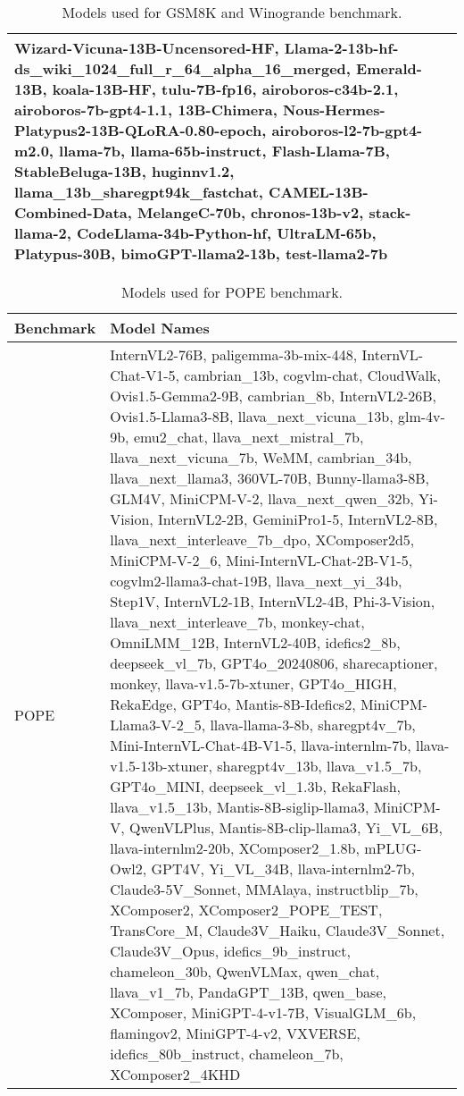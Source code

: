 \begin{table*}[htbp]
\begin{tabular}{p{2cm}p{12cm}}
Wizard-Vicuna-13B-Uncensored-HF, Llama-2-13b-hf-ds\_wiki\_1024\_full\_r\_64\_alpha\_16\_merged, Emerald-13B, koala-13B-HF, tulu-7B-fp16, airoboros-c34b-2.1, airoboros-7b-gpt4-1.1, 13B-Chimera, Nous-Hermes-Platypus2-13B-QLoRA-0.80-epoch, airoboros-l2-7b-gpt4-m2.0, llama-7b, llama-65b-instruct, Flash-Llama-7B, StableBeluga-13B, huginnv1.2, llama\_13b\_sharegpt94k\_fastchat, CAMEL-13B-Combined-Data, MelangeC-70b, chronos-13b-v2, stack-llama-2, CodeLlama-34b-Python-hf, UltraLM-65b, Platypus-30B, bimoGPT-llama2-13b, test-llama2-7b \\
        \bottomrule
    \end{tabular}
    \caption{Models used for GSM8K and Winogrande benchmark.}
    \label{apdtab:winoandGSM8K-model-list}
\end{table*}


\begin{table*}[htbp]
    \renewcommand{\arraystretch}{1.2}
    \centering
    \small
    \setlength{\tabcolsep}{0.5em} %
    \begin{tabular}{p{2cm}p{12cm}}
        \toprule
        \textbf{Benchmark} & \textbf{Model Names} \\
        \midrule
        POPE & InternVL2-76B, paligemma-3b-mix-448, InternVL-Chat-V1-5, cambrian\_13b, cogvlm-chat, CloudWalk, Ovis1.5-Gemma2-9B, cambrian\_8b, InternVL2-26B, Ovis1.5-Llama3-8B, llava\_next\_vicuna\_13b, glm-4v-9b, emu2\_chat, llava\_next\_mistral\_7b, llava\_next\_vicuna\_7b, WeMM, cambrian\_34b, llava\_next\_llama3, 360VL-70B, Bunny-llama3-8B, GLM4V, MiniCPM-V-2, llava\_next\_qwen\_32b, Yi-Vision, InternVL2-2B, GeminiPro1-5, InternVL2-8B, llava\_next\_interleave\_7b\_dpo, XComposer2d5, MiniCPM-V-2\_6, Mini-InternVL-Chat-2B-V1-5, cogvlm2-llama3-chat-19B, llava\_next\_yi\_34b, Step1V, InternVL2-1B, InternVL2-4B, Phi-3-Vision, llava\_next\_interleave\_7b, monkey-chat, OmniLMM\_12B, InternVL2-40B, idefics2\_8b, deepseek\_vl\_7b, GPT4o\_20240806, sharecaptioner, monkey, llava-v1.5-7b-xtuner, GPT4o\_HIGH, RekaEdge, GPT4o, Mantis-8B-Idefics2, MiniCPM-Llama3-V-2\_5, llava-llama-3-8b, sharegpt4v\_7b, Mini-InternVL-Chat-4B-V1-5, llava-internlm-7b, llava-v1.5-13b-xtuner, sharegpt4v\_13b, llava\_v1.5\_7b, GPT4o\_MINI, deepseek\_vl\_1.3b, RekaFlash, llava\_v1.5\_13b, Mantis-8B-siglip-llama3, MiniCPM-V, QwenVLPlus, Mantis-8B-clip-llama3, Yi\_VL\_6B, llava-internlm2-20b, XComposer2\_1.8b, mPLUG-Owl2, GPT4V, Yi\_VL\_34B, llava-internlm2-7b, Claude3-5V\_Sonnet, MMAlaya, instructblip\_7b, XComposer2, XComposer2\_POPE\_TEST, TransCore\_M, Claude3V\_Haiku, Claude3V\_Sonnet, Claude3V\_Opus, idefics\_9b\_instruct, chameleon\_30b, QwenVLMax, qwen\_chat, llava\_v1\_7b, PandaGPT\_13B, qwen\_base, XComposer, MiniGPT-4-v1-7B, VisualGLM\_6b, flamingov2, MiniGPT-4-v2, VXVERSE, idefics\_80b\_instruct, chameleon\_7b, XComposer2\_4KHD \\
        \bottomrule
    \end{tabular}
    \caption{Models used for POPE benchmark.}
    \label{apdtab:pope-model-list}
\end{table*}

